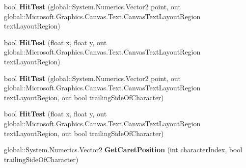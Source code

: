\begin{DoxyCompactItemize}
\item 
\mbox{\label{interface_microsoft_1_1_graphics_1_1_canvas_1_1_text_1_1_i_canvas_text_layout_adeb4ec733847627d081e70843cf372ec}} 
bool {\bfseries Hit\+Test} (global\+::\+System.\+Numerics.\+Vector2 point, out global\+::\+Microsoft.\+Graphics.\+Canvas.\+Text.\+Canvas\+Text\+Layout\+Region text\+Layout\+Region)
\item 
\mbox{\label{interface_microsoft_1_1_graphics_1_1_canvas_1_1_text_1_1_i_canvas_text_layout_a1620bdefefce95ef2ae5525645e72e66}} 
bool {\bfseries Hit\+Test} (float x, float y, out global\+::\+Microsoft.\+Graphics.\+Canvas.\+Text.\+Canvas\+Text\+Layout\+Region text\+Layout\+Region)
\item 
\mbox{\label{interface_microsoft_1_1_graphics_1_1_canvas_1_1_text_1_1_i_canvas_text_layout_ae4c70cf259e0ada5180a328f0e176122}} 
bool {\bfseries Hit\+Test} (global\+::\+System.\+Numerics.\+Vector2 point, out global\+::\+Microsoft.\+Graphics.\+Canvas.\+Text.\+Canvas\+Text\+Layout\+Region text\+Layout\+Region, out bool trailing\+Side\+Of\+Character)
\item 
\mbox{\label{interface_microsoft_1_1_graphics_1_1_canvas_1_1_text_1_1_i_canvas_text_layout_a457ec60b8296c34aec79cbe740e5f6b3}} 
bool {\bfseries Hit\+Test} (float x, float y, out global\+::\+Microsoft.\+Graphics.\+Canvas.\+Text.\+Canvas\+Text\+Layout\+Region text\+Layout\+Region, out bool trailing\+Side\+Of\+Character)
\item 
\mbox{\label{interface_microsoft_1_1_graphics_1_1_canvas_1_1_text_1_1_i_canvas_text_layout_a1ed232fe08a85f9c93273ae59226368a}} 
global\+::\+System.\+Numerics.\+Vector2 {\bfseries Get\+Caret\+Position} (int character\+Index, bool trailing\+Side\+Of\+Character)
\item 
\mbox{\label{interface_microsoft_1_1_graphics_1_1_canvas_1_1_text_1_1_i_canvas_text_layout_a5f70488facfba5d5a53175e0fbdb74e0}} 

\end{DoxyCompactItemize}
